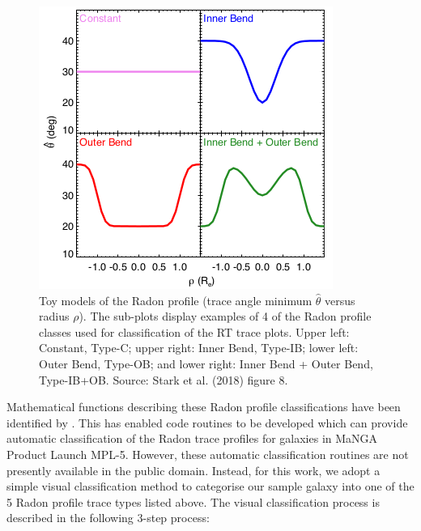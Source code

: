 \begin{figure}
    \centering
    \includegraphics[width=\columnwidth]{images/RadonPlots/Radon-class-models.png}
    \caption{Toy models of the Radon profile (trace angle minimum $\hat\theta$ versus radius $\rho$). The sub-plots display examples of 4 of the Radon profile classes used for classification of the RT trace plots. Upper left: Constant, Type-C; upper right: Inner Bend, Type-IB; lower left: Outer Bend, Type-OB; and lower right: Inner Bend + Outer Bend, Type-IB+OB. Source: Stark et al. (2018) figure 8.}
    \label{fig:class-models}
\end{figure}

Mathematical functions describing these Radon profile classifications have been identified by \citet[][section 3.6]{2018MNRAS.480.2217S}. This has enabled code routines to be developed which can provide automatic classification of the Radon trace profiles for galaxies in MaNGA Product Launch MPL-5. However, these automatic classification routines are not presently available in the public domain. Instead, for this work, we adopt a simple visual classification method to categorise our sample galaxy into one of the 5 Radon profile trace types listed above. The visual classification process is described in the following 3-step process:

